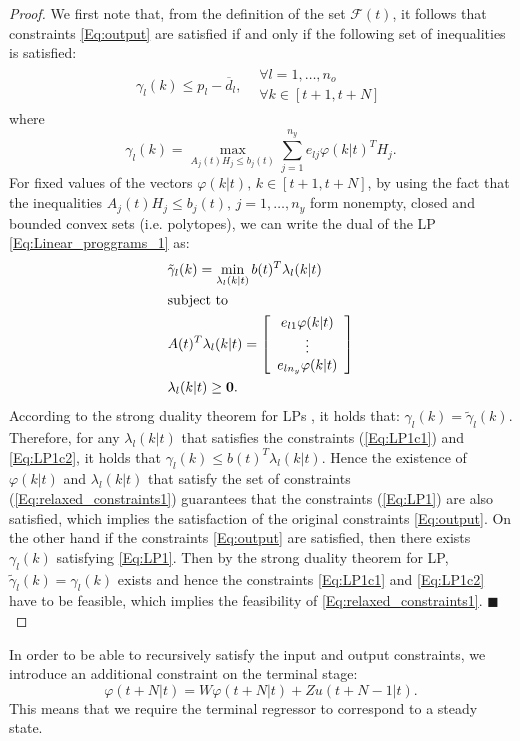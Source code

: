 \documentclass[10 pt, letterpaper]{article}
\newcommand{\beq}{\begin{equation}}
\newcommand{\eeq}{\end{equation}}
\newcommand{\bea}{\begin{eqnarray}}
\newcommand{\eea}{\end{eqnarray}}
\newcommand{\ba}{\begin{array}}
\newcommand{\ea}{\end{array}}
\newtheorem{proof}{Proof}
\begin{document}
\begin{proof}
We first note that, from the definition of the set $\mathcal{F}(t)$, it follows that constraints \eqref{Eq:output} are satisfied if and only if the following set of inequalities is satisfied:
\beq\label{Eq:LP1}
\ba{ll}
\gamma_l(k)\leq p_l\!-\!\overline{d}_l, & \ba{c} \forall l=1,\hdots,n_o\\\forall k\in [t+1,t+N]\ea\ea
\eeq
where
\beq\label{Eq:Linear_proggrams_1}
\gamma_l(k)=\max \limits_{A_j(t)H_j\leq b_j(t)}\sum\limits_{j=1}^{n_y}e_{lj}\varphi(k|t)^TH_j.
\eeq
For fixed values of the vectors $\varphi(k|t), \, k\in [t+1,t+N]$, by using the fact that the inequalities $A_j(t) H_j\leq b_j(t),\, j=1,\hdots, n_y$ form nonempty, closed and bounded convex sets (i.e. polytopes), we can write the dual of the LP \eqref{Eq:Linear_proggrams_1} as:
\bea
&\tilde{\gamma}_l(k)=\min \limits_{\lambda_l(k|t)}b(t)^T\lambda_l(k|t)\\
&\text{subject to} \nonumber\\\label{Eq:LP1c1}
&A(t)^T\lambda_l(k|t)=\left[ \ba{c}
e_{l1}\varphi(k|t)\\
\vdots\\
e_{ln_y}\varphi(k|t)\ea\right]\\\label{Eq:LP1c2}
&\lambda_l(k|t)\geq \bold 0 .
\eea
According to the strong duality theorem for LPs \cite{LP_book}, it holds that: $\gamma_l(k)=\tilde{\gamma}_l(k)$. Therefore, for any $\lambda_l(k|t)$ that satisfies the constraints (\ref{Eq:LP1c1}) and \eqref{Eq:LP1c2}, it holds that $\gamma_l(k) \leq b(t)^T\lambda_l(k|t)$. Hence the existence of $\varphi(k|t)$ and $\lambda_l(k|t)$ that satisfy the set of constraints (\ref{Eq:relaxed_constraints1}) guarantees that the constraints (\ref{Eq:LP1}) are also satisfied, which implies the satisfaction of the original constraints \eqref{Eq:output}. On the other hand if the constraints \eqref{Eq:output} are satisfied, then there exists $\gamma_l(k)$ satisfying \eqref{Eq:LP1}. Then by the strong duality theorem for LP, $\tilde{\gamma}_l(k)=\gamma_l(k)$ exists and hence the constraints \eqref{Eq:LP1c1} and \eqref{Eq:LP1c2} have to be feasible, which implies the feasibility of \eqref{Eq:relaxed_constraints1}. \hfill$\blacksquare$
\end{proof}
In order to be able to recursively satisfy the input and output constraints, we introduce an additional constraint on the terminal stage:
\beq\label{Eq:end_constraint}
\varphi(t+N|t)=W\varphi(t+N|t)+Zu(t+N-1|t).
\eeq
This means that we require the terminal regressor to correspond to a steady state.\\
\end{document}

